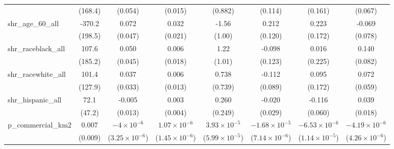 \begin{table}[htbp]
\begin{tabular}{lccccccc}
                                & (168.4)                 & (0.054)                 & (0.015)                 & (0.882)                 & (0.114)                 & (0.161)                 & (0.067)\\   
      shr\_age\_60\_all         & -370.2                  & 0.072                   & 0.032                   & -1.56                   & 0.212                   & 0.223                   & -0.069\\   
                                & (198.5)                 & (0.047)                 & (0.021)                 & (1.00)                  & (0.120)                 & (0.172)                 & (0.078)\\   
      shr\_raceblack\_all       & 107.6                   & 0.050                   & 0.006                   & 1.22                    & -0.098                  & 0.016                   & 0.140\\   
                                & (185.2)                 & (0.045)                 & (0.018)                 & (1.01)                  & (0.123)                 & (0.225)                 & (0.082)\\   
      shr\_racewhite\_all       & 101.4                   & 0.037                   & 0.006                   & 0.738                   & -0.112                  & 0.095                   & 0.072\\   
                                & (127.9)                 & (0.033)                 & (0.013)                 & (0.739)                 & (0.089)                 & (0.172)                 & (0.059)\\   
      shr\_hispanic\_all        & 72.1                    & -0.005                  & 0.003                   & 0.260                   & -0.020                  & -0.116                  & 0.039\\   
                                & (47.2)                  & (0.013)                 & (0.004)                 & (0.249)                 & (0.029)                 & (0.060)                 & (0.018)\\   
      p\_commercial\_km2        & 0.007                   & $-4\times 10^{-6}$      & $1.07\times 10^{-6}$    & $3.93\times 10^{-5}$    & $-1.68\times 10^{-5}$   & $-6.53\times 10^{-6}$   & $-4.19\times 10^{-6}$\\    
                                & (0.009)                 & ($3.25\times 10^{-6}$)  & ($1.45\times 10^{-6}$)  & ($5.99\times 10^{-5}$)  & ($7.14\times 10^{-6}$)  & ($1.14\times 10^{-5}$)  & ($4.26\times 10^{-6}$)\\    

\end{tabular}
\end{table}
